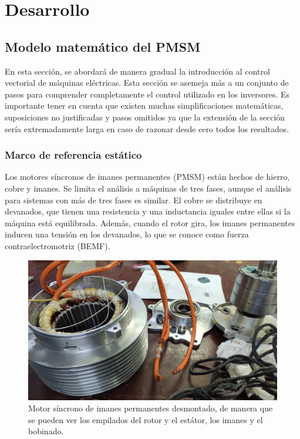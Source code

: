 \chapter{Desarrollo}

\section{Modelo matemático del PMSM}

En esta sección, se abordará de manera gradual la introducción al control vectorial de máquinas eléctricas. Esta sección se asemeja más a un conjunto de pasos para comprender completamente el control utilizado en los inversores. Es importante tener en cuenta que existen muchas simplificaciones matemáticas, suposiciones no justificadas y pasos omitidos ya que la extensión de la sección sería extremadamente larga en caso de razonar desde cero todos los resultados.

\subsection{Marco de referencia estático}

Los motores síncronos de imanes permanentes (PMSM) están hechos de hierro, cobre y imanes. Se limita el análisis a máquinas de tres fases, aunque el análisis para sistemas con más de tres fases es similar. El cobre se distribuye en devanados, que tienen una resistencia y una inductancia iguales entre ellas si la máquina está equilibrada. Además, cuando el rotor gira, los imanes permanentes inducen una tensión en los devanados, lo que se conoce como fuerza contraelectromotriz (BEMF).
\begin{figure}[H]
	\centering
	\includegraphics[width=0.7\linewidth]{fig/MVIMG_20220302_114007.jpg}
	\caption{Motor síncrono de imanes permanentes desmontado, de manera que se pueden ver los empilados del rotor y el estátor, los imanes y el bobinado.}
\end{figure}


